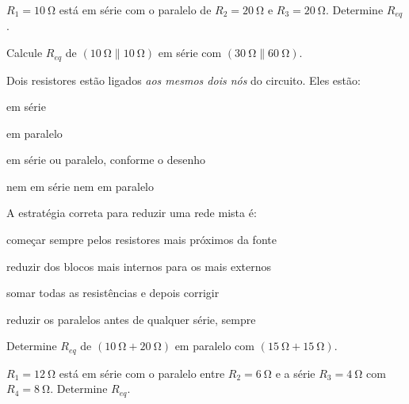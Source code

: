 \blocofixacao
\begin{questao}[1]{}

$R_1=\SI{10}{\ohm}$ está em série com o paralelo de $R_2=\SI{20}{\ohm}$ e
$R_3=\SI{20}{\ohm}$. Determine $R_{eq}$.


\end{questao}
\begin{questao}[1]{}

Calcule $R_{eq}$ de $(\SI{10}{\ohm}\parallel\SI{10}{\ohm})$ em série com
$(\SI{30}{\ohm}\parallel\SI{60}{\ohm})$.


\end{questao}
\begin{questao}[1]{}

Dois resistores estão ligados \emph{aos mesmos dois nós} do circuito. Eles
estão:
\begin{alternativas}[2]
\item em série
\item em paralelo
\item em série ou paralelo, conforme o desenho
\item nem em série nem em paralelo
\end{alternativas}


\end{questao}
\begin{questao}[1]{}

A estratégia correta para reduzir uma rede mista é:
\begin{alternativas}[2]
\item começar sempre pelos resistores mais próximos da fonte
\item reduzir dos blocos mais internos para os mais externos
\item somar todas as resistências e depois corrigir
\item reduzir os paralelos antes de qualquer série, sempre
\end{alternativas}


\end{questao}
\begin{questao}[1]{}

Determine $R_{eq}$ de $(\SI{10}{\ohm}+\SI{20}{\ohm})$ em paralelo com
$(\SI{15}{\ohm}+\SI{15}{\ohm})$.


\end{questao}
\begin{questao}[1]{}

$R_1=\SI{12}{\ohm}$ está em série com o paralelo entre $R_2=\SI{6}{\ohm}$ e a
série $R_3=\SI{4}{\ohm}$ com $R_4=\SI{8}{\ohm}$. Determine $R_{eq}$.


\end{questao}
